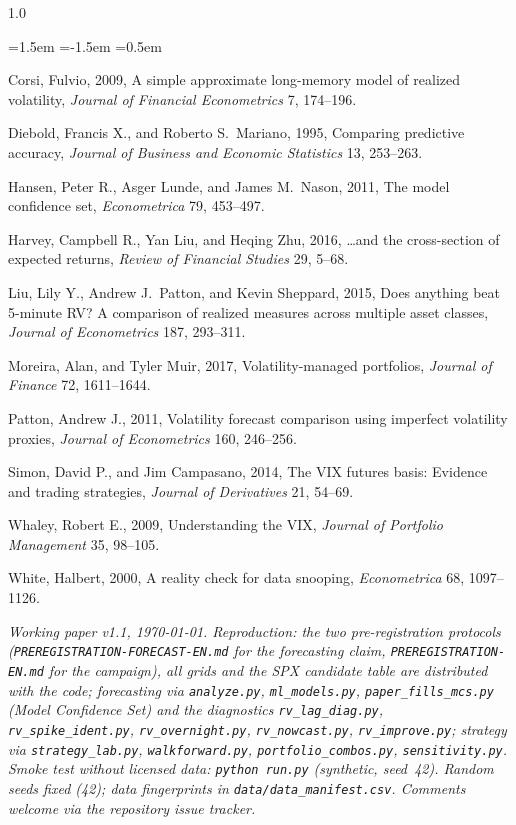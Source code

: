 \documentclass[12pt,a4paper]{article}
\begin{document}
\begin{spacing}{1.0}
\begin{list}{}{\leftmargin=1.5em \itemindent=-1.5em \itemsep=0.5em}
\item Corsi, Fulvio, 2009, A simple approximate long-memory model of realized volatility, \emph{Journal
of Financial Econometrics} 7, 174--196.

\item Diebold, Francis X., and Roberto S.\ Mariano, 1995, Comparing predictive accuracy, \emph{Journal
of Business and Economic Statistics} 13, 253--263.

\item Hansen, Peter R., Asger Lunde, and James M.\ Nason, 2011, The model confidence set,
\emph{Econometrica} 79, 453--497.

\item Harvey, Campbell R., Yan Liu, and Heqing Zhu, 2016, \ldots and the cross-section of expected
returns, \emph{Review of Financial Studies} 29, 5--68.

\item Liu, Lily Y., Andrew J.\ Patton, and Kevin Sheppard, 2015, Does anything beat 5-minute RV? A
comparison of realized measures across multiple asset classes, \emph{Journal of Econometrics} 187,
293--311.

\item Moreira, Alan, and Tyler Muir, 2017, Volatility-managed portfolios, \emph{Journal of Finance} 72,
1611--1644.

\item Patton, Andrew J., 2011, Volatility forecast comparison using imperfect volatility proxies,
\emph{Journal of Econometrics} 160, 246--256.

\item Simon, David P., and Jim Campasano, 2014, The VIX futures basis: Evidence and trading strategies,
\emph{Journal of Derivatives} 21, 54--69.

\item Whaley, Robert E., 2009, Understanding the VIX, \emph{Journal of Portfolio Management} 35, 98--105.

\item White, Halbert, 2000, A reality check for data snooping, \emph{Econometrica} 68, 1097--1126.

\end{list}
\end{spacing}

\vfill
\sloppy\noindent\small\emph{Working paper v1.1, \today. Reproduction: the two pre-registration
protocols (\texttt{PREREGISTRATION-FORECAST-EN.md} for the forecasting claim,
\texttt{PREREGISTRATION-EN.md} for the campaign), all grids and the SPX
candidate table are distributed with the code; forecasting via \texttt{analyze.py}, \texttt{ml\_models.py},
\texttt{paper\_fills\_mcs.py} (Model Confidence Set) and the diagnostics \texttt{rv\_lag\_diag.py},
\texttt{rv\_spike\_ident.py}, \texttt{rv\_overnight.py}, \texttt{rv\_nowcast.py}, \texttt{rv\_improve.py};
strategy via \texttt{strategy\_lab.py}, \texttt{walkforward.py}, \texttt{portfolio\_combos.py},
\texttt{sensitivity.py}. Smoke test without licensed data: \texttt{python run.py} (synthetic, seed~42).
Random seeds fixed (42); data fingerprints in \texttt{data/data\_manifest.csv}. Comments welcome via the
repository issue tracker.}
\end{document}

